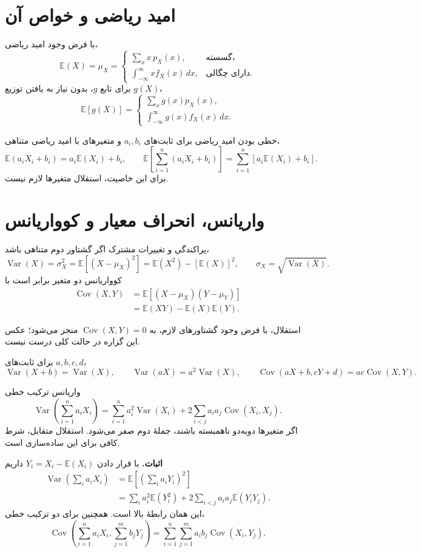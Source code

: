 \documentclass[12pt,a4paper,oneside]{report}
\newcounter{ex}[chapter]
\newcommand{\E}{\mathbb E}
\newcommand{\Var}{\operatorname{Var}}
\newcommand{\Cov}{\operatorname{Cov}}
\begin{document}
\section{امید ریاضی و خواص آن}
با فرض وجود امید ریاضی،
\[
\E(X)=\mu_X=
\begin{cases}
\displaystyle\sum_x x\,p_X(x),&\text{گسسته،}\\[3pt]
\displaystyle\int_{-\infty}^{\infty}x f_X(x)\,dx,&\text{دارای چگالی.}
\end{cases}
\]
برای تابع $g$، بدون نیاز به یافتن توزیع $g(X)$،
\[
\E[g(X)]=
\begin{cases}
\displaystyle\sum_x g(x)p_X(x),\\[3pt]
\displaystyle\int_{-\infty}^{\infty}g(x)f_X(x)\,dx.
\end{cases}
\]
\begin{result}{خطی بودن امید ریاضی}
برای ثابت‌های $a_i,b_i$ و متغیرهای با امید ریاضی متناهی،
\[
\E(a_iX_i+b_i)=a_i\E(X_i)+b_i,
\qquad
\E\left[\sum_{i=1}^n(a_iX_i+b_i)\right]
=\sum_{i=1}^n[a_i\E(X_i)+b_i].
\]
برای این خاصیت، استقلال متغیرها لازم نیست.
\end{result}
\section{واریانس، انحراف معیار و کوواریانس}
\begin{definition}{پراکندگی و تغییرات مشترک}
اگر گشتاور دوم متناهی باشد،
\[
\Var(X)=\sigma_X^2=\E[(X-\mu_X)^2]
=\E(X^2)-[\E(X)]^2,
\qquad \sigma_X=\sqrt{\Var(X)}.
\]
کوواریانس دو متغیر برابر است با
\begin{align*}
\Cov(X,Y)&=\E[(X-\mu_X)(Y-\mu_Y)]\\
&=\E(XY)-\E(X)\E(Y).
\end{align*}
\end{definition}
استقلال، با فرض وجود گشتاورهای لازم، به $\Cov(X,Y)=0$ منجر می‌شود؛ عکس این گزاره در حالت کلی درست نیست.

برای ثابت‌های $a,b,c,d$،
\[
\Var(X+b)=\Var(X),\qquad \Var(aX)=a^2\Var(X),
\qquad \Cov(aX+b,cY+d)=ac\Cov(X,Y).
\]
\begin{result}{واریانس ترکیب خطی}
\[
\Var\left(\sum_{i=1}^na_iX_i\right)
=\sum_{i=1}^na_i^2\Var(X_i)
+2\sum_{i<j}a_ia_j\Cov(X_i,X_j).
\]
اگر متغیرها دوبه‌دو ناهمبسته باشند، جملهٔ دوم صفر می‌شود. استقلال متقابل، شرط کافی برای این ساده‌سازی است.
\end{result}
\textbf{اثبات.} با قرار دادن $Y_i=X_i-\E(X_i)$ داریم
\begin{align*}
\Var\left(\sum_i a_iX_i\right)
&=\E\left[\left(\sum_i a_iY_i\right)^2\right]\\
&=\sum_i a_i^2\E(Y_i^2)+2\sum_{i<j}a_ia_j\E(Y_iY_j).
\end{align*}
این همان رابطهٔ بالا است. همچنین برای دو ترکیب خطی،
\[
\Cov\left(\sum_{i=1}^n a_iX_i,\sum_{j=1}^m b_jY_j\right)
=\sum_{i=1}^n\sum_{j=1}^m a_ib_j\Cov(X_i,Y_j).
\]
\end{document}
